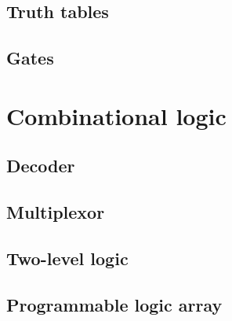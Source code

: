     \subsection{Truth tables}
    
    \subsection{Gates}
    
\section{Combinational logic}\label{section:Combinational_logic}
    
    \subsection{Decoder}
    
    \subsection{Multiplexor}
    
    \subsection{Two-level logic}
    
    \subsection{Programmable logic array}
